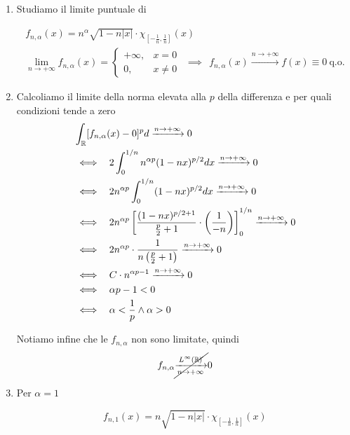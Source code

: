 \Soluzione
\begin{enumerate}
\item Studiamo il limite puntuale di

\begin{gather*}
f_{n,\alpha }(x) = n^{\alpha }\sqrt{1 - n| x| } \cdot \chi _{\left[ - \frac{1}{n} ,\frac{1}{n}\right]}(x)\\
\lim\limits _{n\rightarrow + \infty } f_{n,\alpha }(x) = \begin{cases}
+ \infty , & x = 0\\
0, & x\neq 0
\end{cases} \ \ \implies \ \ f_{n,\alpha }(x)\xrightarrow{n\rightarrow + \infty } f(x) \equiv 0\ \text{q.o.}
\end{gather*}
\item Calcoliamo il limite della norma elevata alla $p$ della differenza e per quali condizioni tende a zero\begin{align*}
 & \int _{\mathbb{R} }[ f_{n,\alpha }(x) - 0]^{p} d\xrightarrow{n\rightarrow + \infty } 0\\
 & \iff \ \ 2\int ^{1/n}_{0} n^{\alpha p}(1 - nx)^{p/2} dx\xrightarrow{n\rightarrow + \infty } 0\\
 & \iff \ \ 2n^{\alpha p}\int ^{1/n}_{0}(1 - nx)^{p/2} dx\xrightarrow{n\rightarrow + \infty } 0\\
 & \iff \ \ 2n^{\alpha p}\left[\frac{(1 - nx)^{p/2 + 1}}{\frac{p}{2} + 1} \cdot \left(\frac{1}{ - n}\right)\right]^{1/n}_{0}\xrightarrow{n\rightarrow + \infty } 0\\
 & \iff \ \ 2n^{\alpha p} \cdot \frac{1}{n\left(\frac{p}{2} + 1\right)}\xrightarrow{n\rightarrow + \infty } 0\\
 & \iff \ \ C\cdot n^{\alpha p - 1}\xrightarrow{n\rightarrow + \infty } 0\\
 & \iff \ \ \alpha p - 1 < 0\\
 & \iff \ \ \alpha < \frac{1}{p} \land \alpha  > 0
\end{align*}

Notiamo infine che le $f_{n,\alpha }$ non sono limitate, quindi\begin{equation*}
f_{n,\alpha }\cancel{\xrightarrow[n\rightarrow + \infty ]{L^{\infty }(\mathbb{R})}} 0
\end{equation*}
\item Per $\alpha = 1$

\begin{equation*}
f_{n,1}(x) = n\sqrt{1 - n| x| } \cdot \chi _{\left[ - \frac{1}{n} ,\frac{1}{n}\right]}(x)
\end{equation*}


\end{enumerate}
